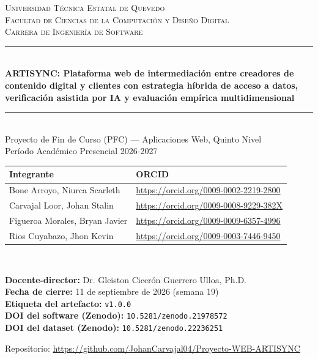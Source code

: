 \documentclass[12pt,a4paper,oneside]{report}
\begin{document}
\thispagestyle{empty}
\centering

\textsc{\Large Universidad Técnica Estatal de Quevedo}\\[0.3cm]
\textsc{\large Facultad de Ciencias de la Computación y Diseño Digital}\\
\textsc{\large Carrera de Ingeniería de Software}\\[1.5cm]

\rule{\linewidth}{0.5mm}\\[0.4cm]
{\LARGE \bfseries ARTISYNC: Plataforma web de intermediación entre
creadores de contenido digital y clientes con estrategia híbrida de acceso
a datos, verificación asistida por IA y evaluación empírica
multidimensional}\\[0.4cm]
\rule{\linewidth}{0.5mm}\\[1cm]

{\large Proyecto de Fin de Curso (PFC) --- Aplicaciones Web, Quinto Nivel}\\
{\large Período Académico Presencial 2026-2027}\\[1.5cm]

\begin{minipage}{0.9\textwidth}
\centering
\begin{tabular}{@{}ll@{}}
\toprule
\textbf{Integrante} & \textbf{ORCID} \\
\midrule
Bone Arroyo, Niurca Scarleth & \url{https://orcid.org/0009-0002-2219-2800} \\
Carvajal Loor, Johan Stalin & \url{https://orcid.org/0009-0008-9229-382X} \\
Figueroa Morales, Bryan Javier & \url{https://orcid.org/0009-0009-6357-4996} \\
Rios Cuyabazo, Jhon Kevin & \url{https://orcid.org/0009-0003-7446-9450} \\
\bottomrule
\end{tabular}
\end{minipage}\\[1cm]

\begin{minipage}{0.85\textwidth}
\centering
\textbf{Docente-director:} Dr. Gleiston Cicerón Guerrero Ulloa, Ph.D.\\
\textbf{Fecha de cierre:} 11 de septiembre de 2026 (semana 19)\\
\textbf{Etiqueta del artefacto:} \texttt{v1.0.0}\\
\textbf{DOI del software (Zenodo):} \texttt{10.5281/zenodo.21978572}\\
\textbf{DOI del dataset (Zenodo):} \texttt{10.5281/zenodo.22236251}\\
\end{minipage}

\vfill
{\small Repositorio: \mbox{\url{https://github.com/JohanCarvajal04/Proyecto-WEB-ARTISYNC}}}
\end{document}
